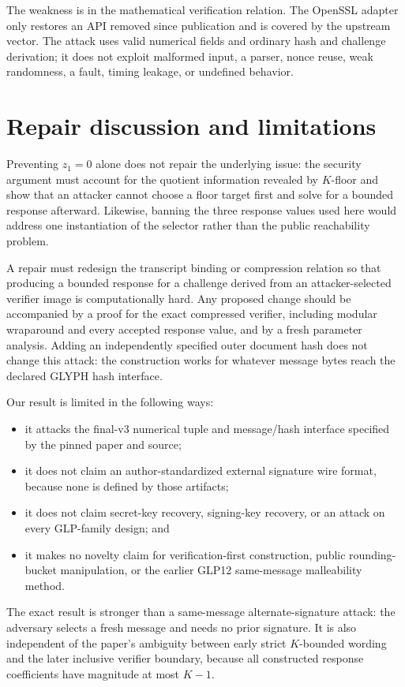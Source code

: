 \documentclass[10pt,a4paper]{article}
\begin{document}
The weakness is in the mathematical verification relation.  The OpenSSL
adapter only restores an API removed since publication and is covered by the
upstream vector.  The attack uses valid numerical fields and ordinary hash
and challenge derivation; it does not exploit malformed input, a parser,
nonce reuse, weak randomness, a fault, timing leakage, or undefined behavior.

\section{Repair discussion and limitations}

Preventing $z_1=0$ alone does not repair the underlying issue: the security
argument must account for the quotient information revealed by $K$-floor and
show that an attacker cannot choose a floor target first and solve for a
bounded response afterward.  Likewise, banning the three response values
used here would address one instantiation of the selector rather than the
public reachability problem.

A repair must redesign the transcript binding or compression relation so
that producing a bounded response for a challenge derived from an
attacker-selected verifier image is computationally hard.  Any proposed
change should be accompanied by a proof for the exact compressed verifier,
including modular wraparound and every accepted response value, and by a
fresh parameter analysis.  Adding an independently specified outer document
hash does not change this attack: the construction works for whatever message
bytes reach the declared GLYPH hash interface.

Our result is limited in the following ways:
\begin{itemize}
  \item it attacks the final-v3 numerical tuple and message/hash interface
  specified by the pinned paper and source;
  \item it does not claim an author-standardized external signature wire
  format, because none is defined by those artifacts;
  \item it does not claim secret-key recovery, signing-key recovery, or an
  attack on every GLP-family design; and
  \item it makes no novelty claim for verification-first construction,
  public rounding-bucket manipulation, or the earlier GLP12 same-message
  malleability method.
\end{itemize}

The exact result is stronger than a same-message alternate-signature attack:
the adversary selects a fresh message and needs no prior signature.  It is
also independent of the paper's ambiguity between early strict
$K$-bounded wording and the later inclusive verifier boundary, because all
constructed response coefficients have magnitude at most $K-1$.
\end{document}
